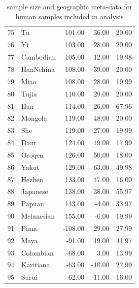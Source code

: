 \documentclass[12pt]{article}
\begin{document}
\begin{table}[ht]
\begin{tabular}{rlrrr}
  75 & \textcolor{Tu}{Tu} & 101.00 & 36.00 & 20.00 \\ 
  76 & \textcolor{Yi}{Yi} & 103.00 & 28.00 & 20.00 \\ 
  77 & \textcolor{Cambodian}{Cambodian} & 105.00 & 12.00 & 19.98 \\ 
  78 & \textcolor{HanNchina}{HanNchina} & 108.00 & 39.00 & 20.00 \\ 
  79 & \textcolor{Miao}{Miao} & 108.00 & 28.00 & 19.99 \\ 
  80 & \textcolor{Tujia}{Tujia} & 110.00 & 29.00 & 20.00 \\ 
  81 & \textcolor{Han}{Han} & 114.00 & 26.00 & 67.96 \\ 
  82 & \textcolor{Mongola}{Mongola} & 119.00 & 48.00 & 20.00 \\ 
  83 & \textcolor{She}{She} & 119.00 & 27.00 & 19.99 \\ 
  84 & \textcolor{Daur}{Daur} & 124.00 & 49.00 & 17.99 \\ 
  85 & \textcolor{Oroqen}{Oroqen} & 126.00 & 50.00 & 18.00 \\ 
  86 & \textcolor{Yakut}{Yakut} & 129.00 & 63.00 & 49.98 \\ 
  87 & \textcolor{Hezhen}{Hezhen} & 133.00 & 47.00 & 16.00 \\ 
  88 & \textcolor{Japanese}{Japanese} & 138.00 & 38.00 & 55.97 \\ 
  89 & \textcolor{Papuan}{Papuan} & 143.00 & -4.00 & 33.97 \\ 
  90 & \textcolor{Melanesian}{Melanesian} & 155.00 & -6.00 & 19.99 \\ 
  91 & \textcolor{Pima}{Pima} & -108.00 & 29.00 & 27.99 \\ 
  92 & \textcolor{Maya}{Maya} & -91.00 & 19.00 & 41.97 \\ 
  93 & \textcolor{Colombian}{Colombian} & -68.00 & 3.00 & 13.99 \\ 
  94 & \textcolor{Karitiana}{Karitiana} & -63.00 & -10.00 & 27.99 \\ 
  95 & \textcolor{Surui}{Surui} & -62.00 & -11.00 & 16.00 \\ 
   \hline
\end{tabular}
   \caption{sample size and geographic meta-data for human samples included in analysis}
   \label{tab:globe_data_table}
\end{table}
\end{document}
